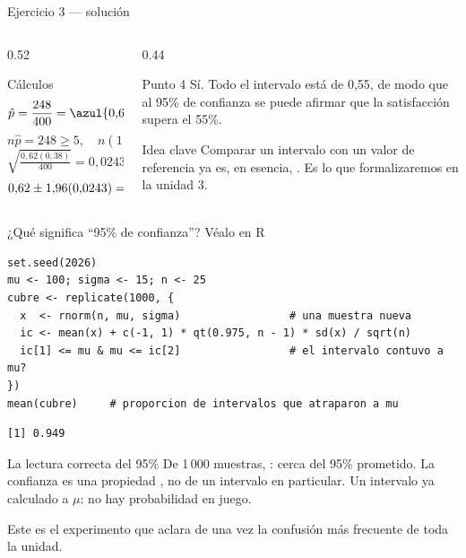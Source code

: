 \documentclass[aspectratio=169,10pt]{beamer}
\begin{document}
\begin{frame}{Ejercicio 3 — solución}
  \begin{columns}[T,onlytextwidth]
    \begin{column}{0.52\textwidth}
      \begin{block}{Cálculos}
        \footnotesize
        \[ \hat p=\frac{248}{400}=\azul{0{,}62} \]
        \[ n\hat p=248\ge 5,\quad n(1-\hat p)=152\ge 5 \;\checkmark \]
        \[ \sqrt{\tfrac{0{,}62(0{,}38)}{400}}=0{,}0243 \]
        \[ 0{,}62\pm 1{,}96(0{,}0243)=\azul{(0{,}5724;\ 0{,}6676)} \]
      \end{block}
    \end{column}
    \begin{column}{0.44\textwidth}
      \begin{exampleblock}{Punto 4}
        \footnotesize
        Sí. Todo el intervalo está  de 0{,}55, de modo que al
        95\% de confianza se puede afirmar que la satisfacción supera el
        55\%.
      \end{exampleblock}
      \begin{alertblock}{Idea clave}
        \footnotesize
        Comparar un intervalo con un valor de referencia ya es, en esencia,
        . Es lo que formalizaremos en la
        unidad 3.
      \end{alertblock}
    \end{column}
  \end{columns}
\end{frame}

\begin{frame}[fragile]{¿Qué significa ``95\% de confianza''? Véalo en R}
  \scriptsize
\begin{lstlisting}[style=Rmini]
set.seed(2026)
mu <- 100; sigma <- 15; n <- 25
cubre <- replicate(1000, {
  x  <- rnorm(n, mu, sigma)                 # una muestra nueva
  ic <- mean(x) + c(-1, 1) * qt(0.975, n - 1) * sd(x) / sqrt(n)
  ic[1] <= mu & mu <= ic[2]                 # el intervalo contuvo a mu?
})
mean(cubre)     # proporcion de intervalos que atraparon a mu
\end{lstlisting}
\begin{lstlisting}[style=Rout]
[1] 0.949
\end{lstlisting}

  \vspace{-0.05cm}
  \begin{alertblock}{La lectura correcta del 95\%}
    \scriptsize
    De 1\,000 muestras, : cerca del 95\% prometido. La confianza es una propiedad
    , no de un intervalo en particular.
    Un intervalo ya calculado  a $\mu$: no hay
    probabilidad en juego.
  \end{alertblock}

  \vspace{0.05cm}
  {\tiny\color{uniGris} Este es el experimento que aclara de una vez la
  confusión más frecuente de toda la unidad.}
\end{frame}
\end{document}
